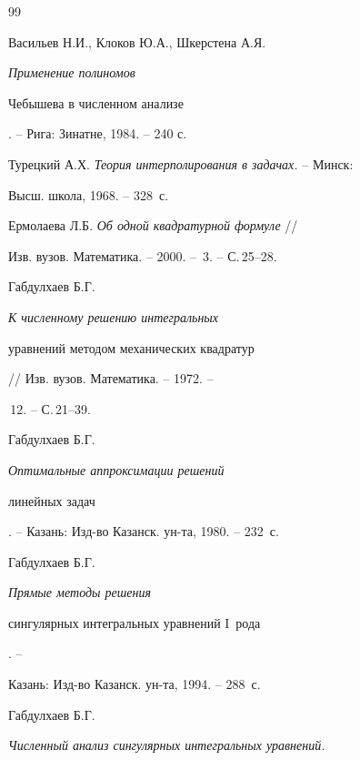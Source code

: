 \begin{thebibliography}{99}










Васильев Н.И.,  Клоков Ю.А.,  Шкерстена А.Я. {\it Применение полиномов


Чебышева в численном анализе}. -- Рига: Зинатне, 1984. -- 240 с.







Турецкий А.Х. {\it Теория интерполирования в задачах.} -- Минск:


Высш. школа, 1968. -- 328~с.







Ермолаева Л.Б. {\it Об одной квадратурной формуле} // 


Изв. вузов. Математика. -- 2000. -- \No\,3. -- С.\,25--28.







Габдулхаев Б.Г. {\it К численному решению интегральных


уравнений методом механических квадратур} // Изв. вузов. Математика. -- 1972. --


\No\,12. -- С.\,21--39.







Габдулхаев Б.Г. {\it Оптимальные аппроксимации решений


линейных задач}. -- Казань: Изд-во Казанск. ун-та, 1980. -- 232~с.







Габдулхаев Б.Г. {\it Прямые методы решения


сингулярных интегральных уравнений $\mathrm I$~рода}. --


Казань: Изд-во Казанск. ун-та, 1994. -- 288~с.







Габдулхаев Б.Г. {\it Численный анализ сингулярных интегральных уравнений. 


}
\end{thebibliography}
